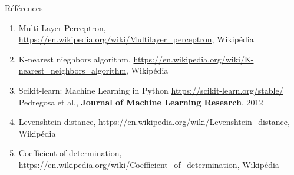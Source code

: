 \documentclass{beamer}
\begin{document}
\begin{frame}{Références}
    \begin{enumerate}
        \item Multi Layer Perceptron, \url{https://en.wikipedia.org/wiki/Multilayer_perceptron}, Wikipédia

        \item K-nearest nieghbors algorithm, \url{https://en.wikipedia.org/wiki/K-nearest_neighbors_algorithm}, Wikipédia

        \item Scikit-learn: Machine Learning in Python \url{https://scikit-learn.org/stable/} Pedregosa et al., \textbf{Journal of Machine Learning Research}, 2012

        \item Levenshtein distance, \url{https://en.wikipedia.org/wiki/Levenshtein_distance}, Wikipédia

        \item Coefficient of determination, \url{https://en.wikipedia.org/wiki/Coefficient_of_determination}, Wikipédia
    \end{enumerate}
\end{frame}
\end{document}
